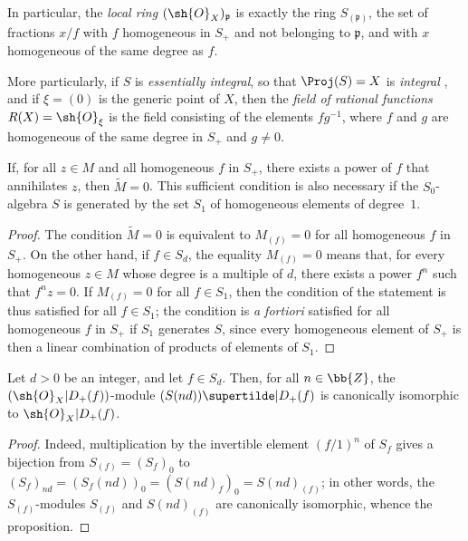 In particular, the \emph{local ring $(\sh{O}_X)_\mathfrak{p}$} is exactly the ring $S_{(\mathfrak{p})}$, the set of fractions $x/f$ with $f$ homogeneous in $S_+$ and not belonging to $\mathfrak{p}$, and with $x$ homogeneous of the same degree as $f$.

More particularly, if $S$ is \emph{essentially integral}, so that $\Proj(S)=X$ is \emph{integral} , and if $\xi=(0)$ is the generic point of $X$, then the \emph{field of rational functions $R(X)=\sh{O}_\xi$} is the field consisting of the elements $fg^{-1}$, where $f$ and $g$ are homogeneous of the same degree in $S_+$ and $g\neq0$.

\begin{proposition}[2.5.6]
\label{II.2.5.6}
If, for all $z\in M$ and all homogeneous $f$ in $S_+$, there exists a power of $f$ that annihilates $z$, then $\widetilde{M}=0$.
This sufficient condition is also necessary if the $S_0$-algebra $S$ is generated by the set $S_1$ of homogeneous elements of degree~$1$.
\end{proposition}

\begin{proof}
The condition $\widetilde{M}=0$ is equivalent to $M_{(f)}=0$ for all homogeneous $f$ in $S_+$.
On the other hand, if $f\in S_d$, the equality $M_{(f)}=0$ means that, for every homogeneous $z\in M$ whose degree is a multiple of $d$, there exists a power $f^n$ such that $f^nz=0$.
If $M_{(f)}=0$ for all $f\in S_1$, then the condition of the statement is thus satisfied for all $f\in S_1$;
the condition is \emph{a fortiori} satisfied for all homogeneous $f$ in $S_+$ if $S_1$ generates $S$, since every homogeneous element of $S_+$ is then a linear combination of products of elements of $S_1$.
\end{proof}

\begin{proposition}[2.5.7]
\label{II.2.5.7}
Let $d>0$ be an integer, and let $f\in S_d$.
Then, for all $n\in\bb{Z}$, the $(\sh{O}_X|D_+(f))$-module $(S(nd))\supertilde|D_+(f)$ is canonically isomorphic to $\sh{O}_X|D_+(f)$.
\end{proposition}

\begin{proof}
Indeed, multiplication by the invertible element $(f/1)^n$ of $S_f$ gives a bijection from $S_{(f)}=(S_f)_0$ to $(S_f)_{nd}=(S_f(nd))_0=(S(nd)_f)_0=S(nd)_{(f)}$;
in other words, the $S_{(f)}$-modules $S_{(f)}$ and $S(nd)_{(f)}$ are canonically isomorphic, whence the proposition.
\end{proof}

